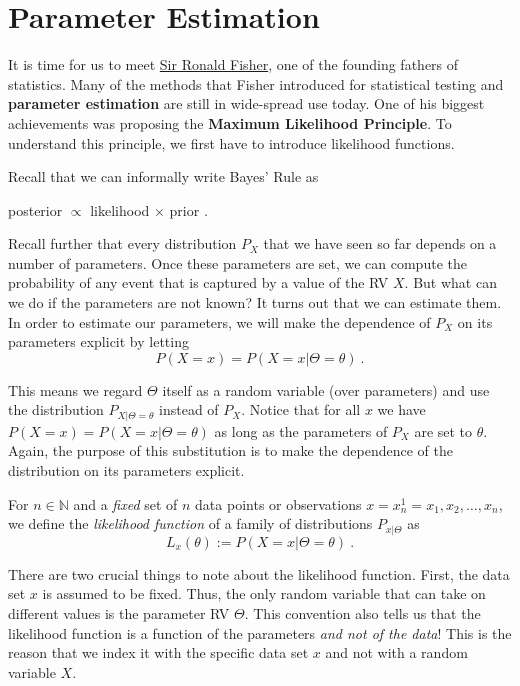 \section{Parameter Estimation}\label{parameterEstimation}

It is time for us to meet \href{https://en.wikipedia.org/wiki/Ronald_Fisher}{Sir Ronald Fisher}, 
one of the founding fathers of statistics. Many of the methods that Fisher introduced
for statistical testing and \textbf{parameter estimation} are still in wide-spread use today. One of his biggest achievements was proposing the 
\textbf{Maximum Likelihood Principle}. To understand this principle, we first have to introduce likelihood functions.

Recall that we can informally write Bayes' Rule as 
\begin{center}
posterior $ \propto $ likelihood $ \times $ prior .
\end{center}
Recall further that every distribution $ P_{X} $ that we have seen so far depends on a number of parameters. 
Once these parameters are set, we can compute the probability of 
any event that is  captured by a value of the RV $ X $. But what can we do if the parameters are not known? It turns out that we can estimate them. In order to 
estimate our parameters, we will make the dependence of $ P_{X} $ on its parameters explicit by letting
\begin{equation}
P(X=x) = P(X=x|\Theta = \theta) \ . 
\end{equation}

This means we regard $ \Theta $ itself as a random variable (over parameters) and use the distribution $ P_{X|\Theta=\theta} $ instead of $ P_{X} $. Notice that for all
$ x $ we have $ P(X=x) = P(X=x|\Theta = \theta) $ as long as the parameters of $ P_{X} $ are set to $ \theta $. Again, the purpose of this substitution is to make
the dependence of the distribution on its parameters explicit.

\begin{Definition}\label{def:likelihood}
For $n \in \mathbb{N} $ and a \emph{fixed} set of $n$ data points or observations $ x = x^{1}_{n}=x_1,x_2,\ldots,x_n$, we define the \emph{likelihood function} of a 
family of distributions $ P_{x|\Theta} $ as $$ L_{x}(\theta) := P(X=x|\Theta = \theta) \ . $$
\end{Definition}

There are two crucial things to note about the likelihood function. First, the data set $ x $ is assumed to be fixed. Thus, the only random variable that can take
on different values is the parameter RV $ \Theta $. This convention also tells us that the likelihood function is a function of the parameters \emph{and not of the data}! This is the reason that we index it with the
specific data set $ x $ and not with a random variable $ X $.

